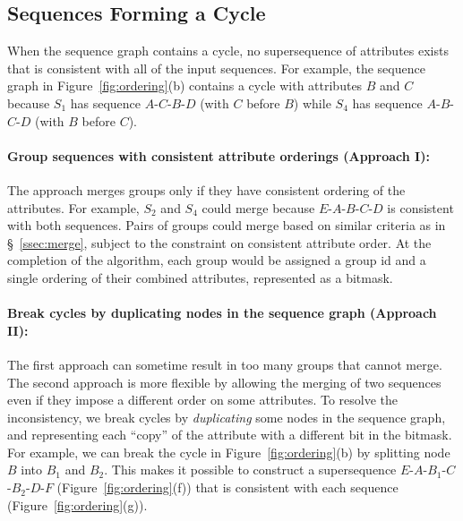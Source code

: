 \subsection{Sequences Forming a Cycle}
\label{ss:breakcycle}
When the sequence graph contains a cycle, no supersequence of attributes exists that is consistent with all of the input sequences.  For example, the sequence graph in Figure~\ref{fig:ordering}(b) contains a cycle with attributes $B$ and $C$ because $S_1$ has sequence $A$-$C$-$B$-$D$ (with $C$ before $B$) while $S_4$ has sequence $A$-$B$-$C$-$D$ (with $B$ before $C$).

\paragraph{Group sequences with consistent attribute orderings (Approach I):} The approach merges groups only if they have consistent ordering of the attributes.  For example, $S_2$ and $S_4$ could merge because $E$-$A$-$B$-$C$-$D$ is consistent with both sequences.  Pairs of groups could merge based on similar
criteria as in \S~\ref{ssec:merge}, subject to the constraint on consistent attribute order.  At the completion
of the algorithm, each group would be assigned a group id and a single ordering of their combined attributes, represented as a bitmask.

\paragraph{Break cycles by duplicating nodes in the sequence graph (Approach II):} The first approach can sometime result in too many groups that cannot merge. The second approach is more flexible by allowing the merging of two sequences even if they impose a different order on some attributes.  To resolve the inconsistency, we break cycles by \emph{duplicating} some nodes in the sequence graph, and representing each ``copy'' of the attribute with a different bit in the bitmask.  For example, we can break the cycle in Figure~\ref{fig:ordering}(b) by splitting node $B$ into $B_1$ and $B_2$.  This makes it possible to construct a supersequence $E$-$A$-$B_1$-$C$-$B_2$-$D$-$F$ (Figure~\ref{fig:ordering}(f)) that is consistent with each sequence (Figure~\ref{fig:ordering}(g)).

